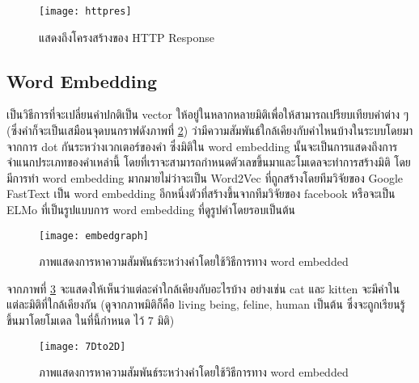 \begin{figure}[H]
    \centering
    \texttt{[image: httpres]}
    \caption{แสดงถึงโครงสร้างของ HTTP Response \cite{Saixiii}}\label{fig:httpres}
\end{figure}

\subsection{Word Embedding}

เป็นวิธีการที่จะเปลี่ยนคำปกติเป็น vector ให้อยู่ในหลากหลายมิติเพื่อให้สามารถเปรียบเทียบคำต่าง ๆ (ซึ่งคำก็จะเป็นเสมือนจุดบนกราฟดังภาพที่ \ref{fig:embedgraph}) 
ว่ามีความสัมพันธ์ใกล้เคียงกับคำไหนบ้างในระบบโดยมาจากการ dot กันระหว่างเวกเตอร์ของคำ 
ซึ่งมิติใน word embedding นั้นจะเป็นการแสดงถึงการจำแนกประเภทของคำเหล่านี้ โดยที่เราจะสามารถกำหนดตัวเลขขึ้นมาและโมเดลจะทำการสร้างมิติ  
 โดยมีการทำ word embedding มากมายไม่ว่าจะเป็น Word2Vec \cite{xin} \cite{Goldberg} ที่ถูกสร้างโดยทีมวิจัยของ 
Google FastText \cite{fasttext} เป็น word embedding อีกหนึ่งตัวที่สร้างขึ้นจากทีมวิจัยของ facebook หรือจะเป็น ELMo \cite{matthew} 
ที่เป็นรูปแบบการ word embedding ที่ดูรูปคำโดยรอบเป็นต้น 

\begin{figure}[H]
    \centering
    \texttt{[image: embedgraph]}
    \caption{ภาพแสดงการหาความสัมพันธ์ระหว่างคำโดยใช้วิธีการทาง word embedded \cite{lukkid}}\label{fig:embedgraph}
\end{figure}

จากภาพที่ \ref{fig:7Dto2D} จะแสดงให้เห็นว่าแต่ละคำใกล้เคียงกับอะไรบ้าง อย่างเช่น cat และ kitten
จะมีค่าในแต่ละมิติที่ใกล้เคียงกัน (ดูจากภาพมิติก็คือ living being, feline, human เป็นต้น ซึ่งจะถูกเรียนรู้ขึ้นมาโดยโมเดล ในที่นี้กำหนด ไว้ 7 มิติ)

\begin{figure}[H]
    \centering
    \texttt{[image: 7Dto2D]}
    \caption{ภาพแสดงการหาความสัมพันธ์ระหว่างคำโดยใช้วิธีการทาง word embedded \cite{sasiwut}}\label{fig:7Dto2D}
\end{figure}


